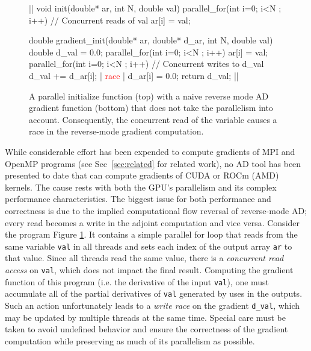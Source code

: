 \begin{figure}
    \centering
\begin{minipage}[T]{0.95\linewidth}
\begin{code}
|\;|
void init(double* ar, int N, double val) {
  parallel_for(int i=0; i<N ; i++)
    // Concurrent reads of val
    ar[i] = val;
}

double gradient_init(double* ar, double* d_ar,
                     int N, double val) {
  double d_val = 0.0;
  parallel_for(int i=0; i<N ; i++)
    ar[i] = val;
  parallel_for(int i=0; i<N ; i++) {
    // Concurrent writes to d_val
    d_val += d_ar[i];                  |\Large\textcolor{red}{{\Lightning{}} race {{}\Lightning{}}}|
    d_ar[i] = 0.0;
  }
  return d_val;
}
|\;|
\end{code}
\end{minipage}
\vspace*{-3mm}
    \caption{
    A parallel initialize function (top) with a naive reverse mode AD gradient function (bottom) that does not take the parallelism into account.
    Consequently, the concurrent read of the variable  causes a race in the reverse-mode gradient computation.
}
    \label{fig:benign_read}
\end{figure}

While  considerable effort has  been expended to compute gradients of MPI and OpenMP programs (see Sec~\ref{sec:related} for related work), no AD tool has been presented to date that can compute gradients of CUDA or ROCm (AMD) kernels. The cause rests with both the GPU's parallelism and its complex performance characteristics. The biggest issue for both performance and correctness is due to the implied computational flow reversal of reverse-mode AD; every read becomes a write in the adjoint computation and vice versa. Consider the program  Figure \ref{fig:benign_read}. It contains a simple parallel for loop that reads from the same variable \texttt{val} in all threads and sets each index of the output array \texttt{ar} to that value. Since all threads read the same value, there is a \textit{concurrent read access} on \texttt{val}, which does not impact the final result. Computing the gradient function of this program (i.e. the derivative of the input \texttt{val}), one must accumulate all of the partial derivatives of \texttt{val} generated by uses in the outputs. Such an action unfortunately leads to a \textit{write race} on the gradient \texttt{d\_val}, which may be updated by multiple threads at the same time. Special care must be taken to avoid undefined behavior and ensure the correctness of the gradient computation while preserving as much of its parallelism as possible.

